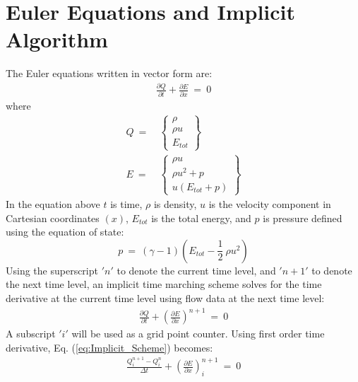 \documentclass[conf]{new-aiaa}
\begin{document}
\section{Euler Equations and Implicit Algorithm}
\label{sec:Euler}
The Euler equations written in vector form are:
\begin{equation}
	\begin{split}
		\label{eq:NS}
  			\frac{\partial{Q}}{\partial{t}} + \frac{\partial{E}}{\partial{x}}~=~0
	\end{split}
\end{equation}
where
\begin{equation}
	\begin{split}
		\label{eq:Q_E_Vectors}
  			Q~=&~\left\{\begin{matrix}
  				\rho \\
  				\rho u \\
  				E_{tot}
  			\end{matrix}\right\} \\
  			E~=&~\left\{\begin{matrix}
  				\rho u \\
  				\rho u^2+p \\
  				u(E_{tot}+p)
  			\end{matrix}\right\}
	\end{split}
\end{equation}
In the equation above $t$ is time, $\rho$ is density, $u$ is the velocity component in Cartesian coordinates $(x)$, $E_{tot}$ is the total energy, and $p$ is pressure defined using the equation of state:
\begin{equation*}
	p~=~\left(\gamma-1\right)\left(E_{tot}-\frac{1}{2}~\rho u^2	\right)
\end{equation*} 
Using the superscript $'n'$ to denote the current time level, and $'n+1'$ to denote the next time level, an implicit time marching scheme solves for the time derivative at the current time level using flow data at the next time level:
\begin{equation}
	\begin{split}
		\label{eq:Implicit_Scheme}
  			\frac{\partial{Q}}{\partial{t}} +\left(\frac{\partial{E}}{\partial{x}}\right)^{n+1}~=~0
	\end{split}
\end{equation}
A subscript $'i'$ will be used as a grid point counter. Using first order time derivative, Eq. (\ref{eq:Implicit_Scheme}) becomes:
\begin{equation}
	\begin{split}
		\label{eq:Implicit_Scheme_1st}
  			\frac{Q_i^{n+1}-Q_i^{n}}{\Delta{t}} +\left(\frac{\partial{E}}{\partial{x}}\right)^{n+1}_i~=~0
	\end{split}
\end{equation}
\end{document}
